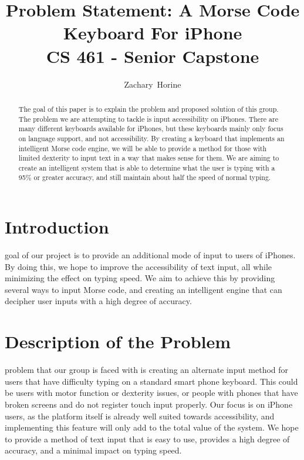 \documentclass[journal,draftclsnofoot,onecolumn]{IEEEtran}
\begin{document}
\title{Problem Statement:
\linebreak
A Morse Code Keyboard For iPhone\\ {\large CS 461 - Senior Capstone }}%

\author{Zachary~Horine%
}

%

\maketitle

\begin{abstract}
The goal of this paper is to explain the problem and proposed solution of this group. The problem we are attempting to tackle is input accessibility on iPhones. There are many different keyboards available for iPhones, but these keyboards mainly only focus on language support, and not accessibility. By creating a keyboard that implements an intelligent Morse code engine, we will be able to provide a method for those with limited dexterity to input text in a way that makes sense for them. We are aiming to create an intelligent system that is able to determine what the user is typing with a 95\% or greater accuracy, and still maintain about half the speed of normal typing.
\end{abstract}
\newpage

\section{Introduction}
 goal of our project is to provide an additional mode of input to users of iPhones. By doing this, we hope to improve the accessibility of text input, all while minimizing the effect on typing speed. We aim to achieve this by providing several ways to input Morse code, and creating an intelligent engine that can decipher user inputs with a high degree of accuracy.

\section{Description of the Problem}
 problem that our group is faced with is creating an alternate input method for users that have difficulty typing on a standard smart phone keyboard. This could be users with motor function or dexterity issues, or people with phones that have broken screens and do not register touch input properly. Our focus is on iPhone users, as the platform itself is already well suited towards accessibility, and implementing this feature will only add to the total value of the system. We hope to provide a method of text input that is easy to use, provides a high degree of accuracy, and a minimal impact on typing speed.
\end{document}
